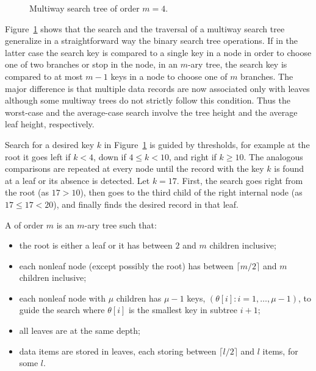 \begin{figure}[htb]
\begin{center}
\caption{\label{mtr-ex} Multiway search tree of order $m=4$.}
\end{center}
\end{figure}

Figure~\ref{mtr-ex} shows that the search and the traversal of a
multiway search tree generalize in a straightforward way the binary
search tree operations. If in the latter case the search key is compared
to a single key in a node in order to choose one of two branches or stop
in the node, in an $m$-ary tree, the search key is compared to at most
$m-1$ keys in a node to choose one of $m$ branches. The major difference
is that multiple data records are now associated only with leaves
although some multiway trees do not strictly follow this condition. Thus
the worst-case and the average-case search involve the tree height and
the average leaf height, respectively.

\begin{Example}
Search for a desired key $k$ in Figure~\ref{mtr-ex} is guided by
thresholds, for example at the root it goes left if $k<4$, down if $4
\le k < 10$, and right if $k \ge 10$. The analogous comparisons are
repeated at every node until the record with the key $k$ is found at a
leaf or its absence is detected. Let $k=17$. First, the search goes
right from the root (as $17 > 10$), then goes to the third child of the
right internal node (as $17 \le 17 < 20$), and finally finds the desired
record in that leaf.
\end{Example}

\begin{Definition}
A  of order $m$ is an $m$-ary tree such that:
\begin{itemize} 
\item the root is either a leaf or it has between $2$ and
$m$ children inclusive; 
\item each nonleaf node (except possibly the root) has
between $\lceil m/2 \rceil$ and $m$ children inclusive;
\item each nonleaf node with $\mu$ children has $\mu-1$
keys, $(\theta[i]: i=1,\ldots,\mu-1)$, to guide the search where $\theta[i]$ is the smallest key in subtree $i+1$;
\item all leaves are at the same depth;
\item data items are stored in leaves, each storing between $\lceil l/2 \rceil$ and $l$ items, for some $l$.
\end{itemize} 
\end{Definition}

